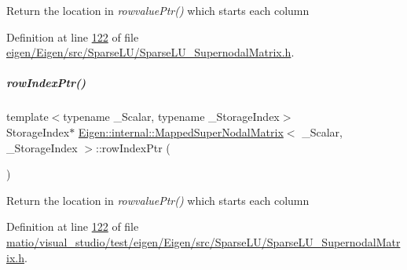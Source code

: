 Return the location in {\itshape rowvalue\+Ptr()} which starts each column 

Definition at line \hyperlink{eigen_2_eigen_2src_2_sparse_l_u_2_sparse_l_u___supernodal_matrix_8h_source_l00122}{122} of file \hyperlink{eigen_2_eigen_2src_2_sparse_l_u_2_sparse_l_u___supernodal_matrix_8h_source}{eigen/\+Eigen/src/\+Sparse\+L\+U/\+Sparse\+L\+U\+\_\+\+Supernodal\+Matrix.\+h}.

\mbox{\label{group___sparse_l_u___module_a826186a823bf49f81b20673cce741250}} 
\subparagraph{\texorpdfstring{row\+Index\+Ptr()}{rowIndexPtr()}\hspace{0.1cm}{\footnotesize\ttfamily [2/2]}}
{\footnotesize\ttfamily template$<$typename \+\_\+\+Scalar, typename \+\_\+\+Storage\+Index$>$ \\
Storage\+Index$\ast$ \hyperlink{group___sparse_l_u___module_class_eigen_1_1internal_1_1_mapped_super_nodal_matrix}{Eigen\+::internal\+::\+Mapped\+Super\+Nodal\+Matrix}$<$ \+\_\+\+Scalar, \+\_\+\+Storage\+Index $>$\+::row\+Index\+Ptr (\begin{DoxyParamCaption}{ }\end{DoxyParamCaption})\hspace{0.3cm}{\ttfamily [inline]}}

Return the location in {\itshape rowvalue\+Ptr()} which starts each column 

Definition at line \hyperlink{matio_2visual__studio_2test_2eigen_2_eigen_2src_2_sparse_l_u_2_sparse_l_u___supernodal_matrix_8h_source_l00122}{122} of file \hyperlink{matio_2visual__studio_2test_2eigen_2_eigen_2src_2_sparse_l_u_2_sparse_l_u___supernodal_matrix_8h_source}{matio/visual\+\_\+studio/test/eigen/\+Eigen/src/\+Sparse\+L\+U/\+Sparse\+L\+U\+\_\+\+Supernodal\+Matrix.\+h}.

